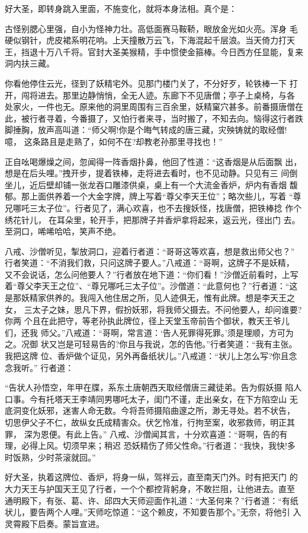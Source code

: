好大圣，即转身跳入里面，不施变化，就将本身法相。真个是：

古怪别腮心里强，自小为怪神力壮。高低面赛马鞍鞒，眼放金光如火亮。浑身
毛硬似钢针，虎皮裙系明花响。上天撞散万云飞，下海混起千层浪。当天倚力打天
王，挡退十万八千将。官封大圣美猴精，手中惯使金箍棒。今日西方任显能，复来
洞内扶三藏。

你看他停住云光，径到了妖精宅外。见那门楼门关了，不分好歹，轮铁棒一下
打开，闯将进去。那里边静悄悄，全无人迹。东廊下不见唐僧；亭子上桌椅，与各
处家火，一件也无。原来他的洞里周围有三百余里，妖精窠穴甚多。前番摄唐僧在
此，被行者寻着，今番摄了，又怕行者来寻，当时搬了，不知去向。恼得这行者跌
脚捶胸，放声高叫道：“师父啊!你是个晦气转成的唐三藏，灾殃铸就的取经僧!噫，
这条路且是走熟了，如何不在?却教老孙那里寻找也！”

正自吆喝爆燥之间，忽闻得一阵香烟扑鼻，他回了性道：“这香烟是从后面飘
出，想是在后头哩。”拽开步，提着铁棒，走将进去看时，也不见动静。只见有三
间倒坐儿，近后壁却铺一张龙吞口雕漆供桌，桌上有一个大流金香炉，炉内有香烟
馥郁。那上面供养着一个大金字牌，牌上写着“尊父李天王位”；略次些儿，写着
“尊兄哪吒三太子位”。行者见了，满心欢喜，也不去搜妖怪，找唐僧，把铁棒捻
作个绣花针儿，在耳朵里，轮开手，把那牌子并香炉拿将起来，返云光，径出门
去。至洞口，唏唏哈哈，笑声不绝。

八戒、沙僧听见，掣放洞口，迎着行者道：“哥哥这等欢喜，想是救出师父也？”
行者笑道：“不消我们救，只问这牌子要人。”八戒道：“哥啊，这牌子不是妖精，
又不会说话，怎么问他要人？”行者放在地下道：“你们看！”沙僧近前看时，上写
着“尊父李天王之位”、“尊兄哪吒三太子位”。沙僧道：“此意何也？”行者道：“这
是那妖精家供养的。我闯入他住居之所，见人迹俱无，惟有此牌。想是李天王之女，
三太子之妹，思凡下界，假扮妖邪，将我师父摄去。不问他要人，却问谁要?你两
个且在此把守，等老孙执此牌位，径上天堂玉帝前告个御状，教天王爷儿们，还我
师父。”八戒道：“哥啊，常言道：‘告人死罪得死罪。’须是理顺，方可为之。况御
状又岂是可轻易告的?你且与我说，怎的告他。”行者笑道：“我有主张。我把这牌
位、香炉做个证见，另外再备纸状儿。”八戒道：“状儿上怎么写?你且念念我听。”
行者道：

“告状人孙悟空，年甲在牒，系东土唐朝西天取经僧唐三藏徒弟。告为假妖摄
陷人口事。今有托塔天王李靖同男哪吒太子，闺门不谨，走出亲女，在下方陷空山
无底洞变化妖邪，迷害人命无数。今将吾师摄陷曲邃之所，渺无寻处。若不状告，
切思伊父子不仁，故纵女氏成精害众。伏乞怜准，行拘至案，收邪救师，明正其罪，
深为恩便。有此上告。”
八戒、沙僧闻其言，十分欢喜道：“哥啊，告的有理，必得上风。切须早来；稍迟
恐妖精伤了师父性命。”行者道：“我快，我快!多时饭熟，少时茶滚就回。”

好大圣，执着这牌位、香炉，将身一纵，驾祥云，直至南天门外。时有把天门
的大力天王与护国天王见了行者，一个个都控背躬身，不敢拦阻，让他进去。直至
通明殿下，有张、葛、许、邱四大天师迎面作礼道：“大圣何来？”行者道：“有纸
状儿，要告两个人哩。”天师吃惊道：“这个赖皮，不知要告那个。”无奈，将他引
入灵霄殿下启奏。蒙旨宣进。

